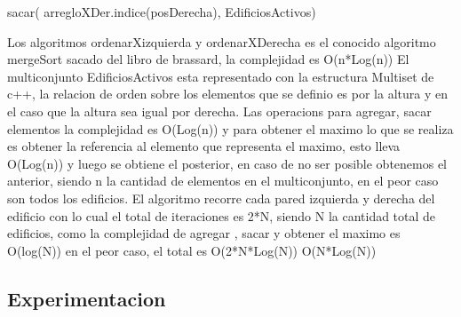 					sacar( arregloXDer.indice(posDerecha), EdificiosActivos)
			
Los algoritmos ordenarXizquierda y ordenarXDerecha es el conocido algoritmo mergeSort sacado del libro de brassard, la complejidad es O(n*Log(n))
El multiconjunto EdificiosActivos esta representado con la estructura Multiset de c++, la relacion de orden sobre los elementos que se definio es por la altura y en el caso que la altura sea igual por derecha.
Las operacions para agregar, sacar elementos la complejidad es O(Log(n)) y para obtener el maximo lo que se realiza es obtener la referencia al elemento que 
representa el maximo, esto lleva O(Log(n)) y luego se obtiene el posterior, en caso de no ser posible obtenemos el anterior, siendo n la cantidad de elementos en el multiconjunto, en el peor caso son todos los edificios.
El algoritmo recorre cada pared izquierda y derecha del edificio con lo cual el total de iteraciones es 2*N, siendo N la cantidad total de edificios, como la complejidad de agregar , sacar y obtener el maximo es O(log(N)) en el peor caso, el total es O(2*N*Log(N)) \in O(N*Log(N))
 



				

\subsection{Experimentacion}

  



